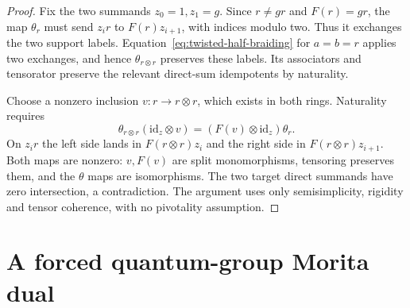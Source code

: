 \begin{proof}
Fix the two summands $z_0=1,z_1=g$. Since $r\ne gr$ and
$F(r)=gr$, the map $\theta_r$ must send $z_i r$ to
$F(r)z_{i+1}$, with indices modulo two. Thus it exchanges the
two support labels. Equation~\eqref{eq:twisted-half-braiding}
for $a=b=r$ applies two exchanges, and hence $\theta_{r\otimes r}$
preserves these labels. Its associators and tensorator preserve
the relevant direct-sum idempotents by naturality.

Choose a nonzero inclusion $v:r\to r\otimes r$, which exists
in both rings. Naturality requires
\[
\theta_{r\otimes r}(\mathrm{id}_z\otimes v)
 =(F(v)\otimes\mathrm{id}_z)\theta_r.
\]
On $z_i r$ the left side lands in $F(r\otimes r)z_i$ and
the right side in $F(r\otimes r)z_{i+1}$. Both maps are
nonzero: $v,F(v)$ are split monomorphisms, tensoring preserves
them, and the $\theta$ maps are isomorphisms. The two target
direct summands have zero intersection, a contradiction.
The argument uses only semisimplicity, rigidity and tensor
coherence, with no pivotality assumption.
\end{proof}

\section{A forced quantum-group Morita dual}
\label{sec:r342-morita}

